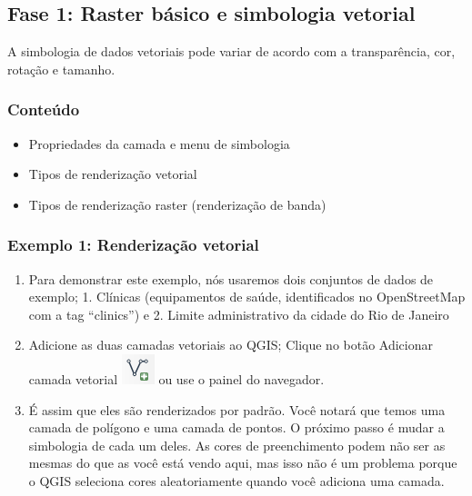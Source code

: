 \documentclass[
]{book}
\providecommand{\tightlist}{%
  \setlength{\itemsep}{0pt}\setlength{\parskip}{0pt}}
\begin{document}
\hypertarget{fase-1-raster-buxe1sico-e-simbologia-vetorial}{%
\subsection{Fase 1: Raster básico e simbologia vetorial}\label{fase-1-raster-buxe1sico-e-simbologia-vetorial}}

A simbologia de dados vetoriais pode variar de acordo com a transparência, cor, rotação e tamanho.

\hypertarget{conteuxfado}{%
\subsubsection{\texorpdfstring{\textbf{Conteúdo}}{Conteúdo}}\label{conteuxfado}}

\begin{itemize}
\tightlist
\item
  Propriedades da camada e menu de simbologia
\item
  Tipos de renderização vetorial
\item
  Tipos de renderização raster (renderização de banda)
\end{itemize}

\hypertarget{exemplo-1-renderizauxe7uxe3o-vetorial}{%
\subsubsection{\texorpdfstring{\textbf{Exemplo 1: Renderização vetorial}}{Exemplo 1: Renderização vetorial}}\label{exemplo-1-renderizauxe7uxe3o-vetorial}}

\begin{enumerate}
\def\labelenumi{\arabic{enumi}.}
\tightlist
\item
  Para demonstrar este exemplo, nós usaremos dois conjuntos de dados de exemplo; 1. Clínicas (equipamentos de saúde, identificados no OpenStreetMap com a tag ``clinics'') e 2. Limite administrativo da cidade do Rio de Janeiro
\item
  Adicione as duas camadas vetoriais ao QGIS; Clique no botão Adicionar camada vetorial \includegraphics{media/modulo4/add-vector.png} ou use o painel do navegador.
\item
  É assim que eles são renderizados por padrão. Você notará que temos uma camada de polígono e uma camada de pontos. O próximo passo é mudar a simbologia de cada um deles. As cores de preenchimento podem não ser as mesmas do que as você está vendo aqui, mas isso não é um problema porque o QGIS seleciona cores aleatoriamente quando você adiciona uma camada.
\end{enumerate}
\end{document}
